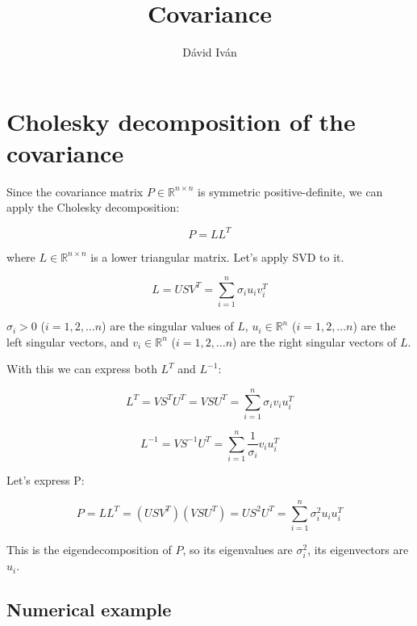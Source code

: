 \documentclass{article}
\title{Covariance}
\author{Dávid Iván}
\begin{document}
\maketitle

\tableofcontents

\newpage



\section{Cholesky decomposition of the covariance}

Since the covariance matrix $P \in \mathbb{R}^{n\times n}$ is symmetric positive-definite, we can apply the Cholesky decomposition:

\begin{equation}\label{eq:Cholesky}
    P = L L^T
\end{equation}

where $L \in \mathbb{R}^{n\times n}$ is a lower triangular matrix. Let's apply SVD to it.

\begin{equation}
    L = U S V^T = \sum_{i=1}^{n} \sigma_i u_i v_i^T
\end{equation}

$\sigma_i > 0$ ($i=1, 2, \dots n$) are the singular values of $L$, $u_i \in \mathbb{R}^n$ ($i=1, 2, \dots n$) are the left singular vectors, and $v_i \in \mathbb{R}^n$ ($i=1, 2, \dots n$) are the right singular vectors of $L$. 

With this we can express both $L^T$ and $L^{-1}$:

\begin{equation}
    L^T = V S^T U^T = V S U^T = \sum_{i=1}^{n} \sigma_i v_i u_i^T
\end{equation}

\begin{equation}\label{eq:Linv}
    L^{-1} = V S^{-1} U^T = \sum_{i=1}^{n} \frac{1}{\sigma_i} v_i u_i^T
\end{equation}

Let's express P:

\begin{equation}
    P = LL^T = (USV^T) (VSU^T) = US^2U^T = \sum_{i=1}^{n} \sigma_i^2 u_i u_i^T
\end{equation}

This is the eigendecomposition of $P$, so its eigenvalues are $\sigma_i^2$, its eigenvectors are $u_i$.

\subsection{Numerical example}
\end{document}
